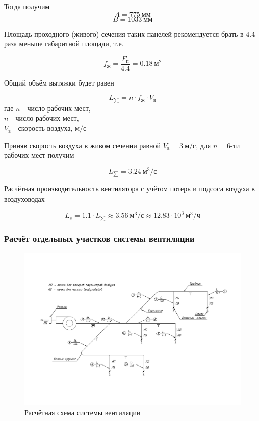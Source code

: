 Тогда получим
$$
    A = 775 ~\text{мм}
$$
$$
    B = 1033 ~\text{мм}
$$

Площадь проходного (живого) сечения таких панелей рекомендуется брать в 4.4
раза меньше габаритной площади, т.е.

\begin{equation}
\label{alive_section_are}
    f_\text{ж} = \frac{F_\text{п}}{4.4} = 0.18 ~\text{м}^2
\end{equation}

Общий объём вытяжки будет равен

\begin{equation}
\label{overall_sucktion_volume}
    L_{\sum} = n \cdot f_\text{ж} \cdot V_\text{в}
\end{equation}
где $n$ - число рабочих мест,                   \\
$n$ - число рабочих мест,                       \\
$V_\text{в}$ - скорость воздуха, $\text{м/с}$

Приняв скорость воздуха в живом сечении равной $V_\text{в} = 3 ~\text{м/с}$,
для $n = 6$-ти рабочих мест получим

$$
    L_{\sum} = 3.24 ~\text{м}^3 / \text{с}
$$

Расчётная производительность вентилятора с учётом потерь и подсоса воздуха
в воздуховодах

\begin{equation}
\label{fan_productivity}
    L_s = 1.1 \cdot L_{\sum}
        \approx 3.56 ~\text{м}^3 / \text{с}
        \approx 12.83 \cdot 10^3 ~\text{м}^3 / \text{ч}
\end{equation}

\subsubsection{Расчёт отдельных участков системы вентиляции}

\begin{figure}[ht]
    \centering
    \includegraphics[width=\textwidth, keepaspectratio, clip=true, trim=0mm 35mm 0mm 40mm]
                    {./src/ecology/pictures/vent_system_arrangement}
    \caption{Расчётная схема системы вентиляции}
    \label{pic_vent_system_arrangement}
\end{figure}


